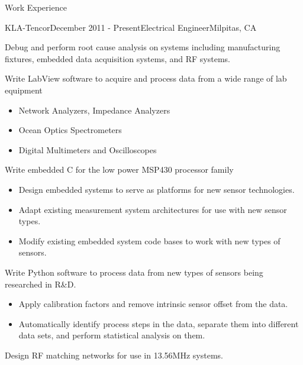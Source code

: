 \documentclass{resume} %
\begin{document}
\begin{rSection}{Work Experience}

\begin{rSubsection}{KLA-Tencor}{December 2011 - Present}{Electrical Engineer}{Milpitas, CA}
\smallskip
\item Debug and perform root cause analysis on systems including manufacturing fixtures, embedded data acquisition systems, and RF systems.

\item Write LabView software to acquire and process data from a wide range of lab equipment
\begin{itemize}
\itemsep -0.5em \vspace{-0.5em}
\renewcommand{\labelitemi}{-}
\item Network Analyzers, Impedance Analyzers
\item Ocean Optics Spectrometers
\item Digital Multimeters and Oscilloscopes
\end{itemize}

\item Write embedded C for the low power MSP430 processor family
\begin{itemize}
\itemsep -0.5em \vspace{-0.5em}
\renewcommand{\labelitemi}{-}
\item Design embedded systems to serve as platforms for new sensor technologies.
\item Adapt existing measurement system architectures for use with new sensor types.
\item Modify existing embedded system code bases to work with new types of sensors. 
\end{itemize}

\item Write Python software to process data from new types of sensors being researched in R\&D.
\begin{itemize}
\itemsep -0.5em \vspace{-0.5em}
\renewcommand{\labelitemi}{-}
\item Apply calibration factors and remove intrinsic sensor offset from the data.
\item Automatically identify process steps in the data, separate them into different data sets, and perform statistical analysis on them.
\end{itemize}

\item Design RF matching networks for use in 13.56MHz systems.


\end{rSubsection}
\end{rSection}
\end{document}
